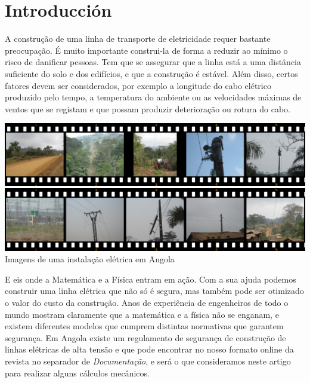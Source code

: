 \section{Introducción}
\label{sec:introduccion}

A construção de uma linha de transporte de eletricidade requer
bastante preocupação. É muito importante construi-la de forma a
reduzir ao mínimo o risco de danificar pessoas. Tem que se assegurar
que a linha está a uma distância suficiente do solo e dos edifícios, e
que a construção é estável. Além disso, certos fatores devem ser
considerados, por exemplo a longitude do cabo elétrico produzido pelo
tempo, a temperatura do ambiente ou as velocidades máximas de ventos
que se registam e que possam produzir deterioração ou rotura do cabo.

\begin{figurebox}
  \vspace{20pt}
  \centering
  \includegraphics[scale=0.35]{InstalacionLinea.png}\\
  \includegraphics[scale=0.35]{InstalacionLinea2.png}\\
  Imagens de uma instalação elétrica em Angola\\ 
\end{figurebox}

E eis onde a Matemática e a Física entram em ação. Com a sua ajuda
podemos construir uma linha elétrica que não só é segura, mas também
pode ser otimizado o valor do custo da construção. Anos de experiência
de engenheiros de todo o mundo mostram claramente que a matemática e a
física não se enganam, e existem diferentes modelos que cumprem
distintas normativas que garantem segurança. Em Angola existe um
regulamento de segurança de construção de linhas elétricas de alta
tensão e que pode encontrar no nosso formato online da revista no
separador de \emph{Documentação}, e será o que consideramos neste
artigo para realizar alguns cálculos mecânicos.

